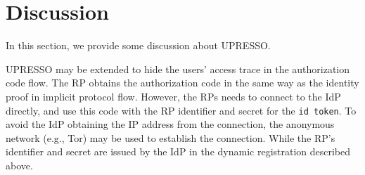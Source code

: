 ﻿\section{Discussion}
\label{sec:discussion}
In this section, we provide some discussion about UPRESSO.


 UPRESSO may be extended to hide the users' access trace in  the authorization code flow. The RP obtains the authorization code in the same way as the  identity proof in implicit protocol flow. However, the RPs needs to connect to the IdP directly, and  use this code with  the RP identifier and secret for the \verb+id token+. To avoid the IdP obtaining the IP address from the connection, the anonymous network (e.g., Tor) may be used to establish the connection. While the RP's identifier and secret are issued by the IdP in the dynamic registration described above.


